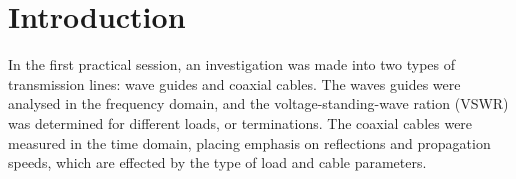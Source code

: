 \section*{Introduction}

In the first practical session, an investigation was made into two types of transmission lines: wave guides and coaxial cables. The waves guides were analysed in the frequency domain, and the voltage-standing-wave ration (VSWR) was determined for different loads, or terminations. The coaxial cables were measured in the time domain, placing emphasis on reflections and propagation speeds, which are effected by the type of load and cable parameters.
